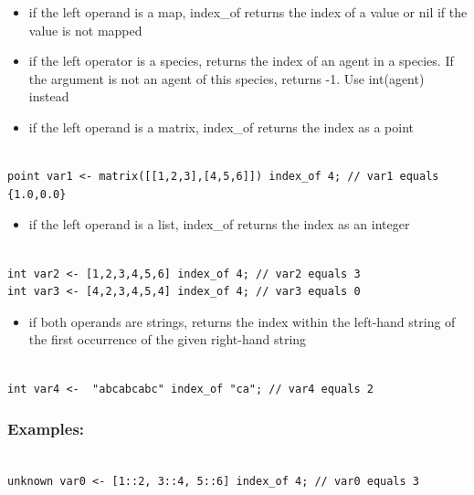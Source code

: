\documentclass[]{book}
\providecommand{\tightlist}{%
  \setlength{\itemsep}{0pt}\setlength{\parskip}{0pt}}
\theoremstyle{definition}
\theoremstyle{definition}
\theoremstyle{definition}
\theoremstyle{remark}
\begin{document}
\begin{itemize}
\tightlist
\item
  if the left operand is a map, index\_of returns the index of a value
  or nil if the value is not mapped\\
\item
  if the left operator is a species, returns the index of an agent in a
  species. If the argument is not an agent of this species, returns -1.
  Use int(agent) instead\\
\item
  if the left operand is a matrix, index\_of returns the index as a
  point
\end{itemize}

\begin{verbatim}
 
point var1 <- matrix([[1,2,3],[4,5,6]]) index_of 4; // var1 equals {1.0,0.0}
\end{verbatim}

\begin{itemize}
\tightlist
\item
  if the left operand is a list, index\_of returns the index as an
  integer
\end{itemize}

\begin{verbatim}
 
int var2 <- [1,2,3,4,5,6] index_of 4; // var2 equals 3 
int var3 <- [4,2,3,4,5,4] index_of 4; // var3 equals 0
\end{verbatim}

\begin{itemize}
\tightlist
\item
  if both operands are strings, returns the index within the left-hand
  string of the first occurrence of the given right-hand string
\end{itemize}

\begin{verbatim}
 
int var4 <-  "abcabcabc" index_of "ca"; // var4 equals 2
\end{verbatim}

\subsubsection{Examples:}\label{examples-208}

\begin{verbatim}
 
unknown var0 <- [1::2, 3::4, 5::6] index_of 4; // var0 equals 3
\end{verbatim}
\end{document}
